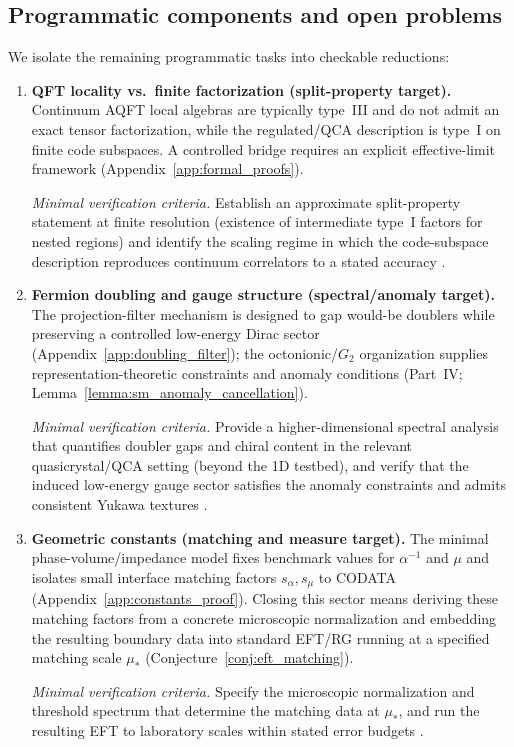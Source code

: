 \subsection{Programmatic components and open problems}
We isolate the remaining programmatic tasks into checkable reductions:
\begin{enumerate}
    \item \textbf{QFT locality vs.\ finite factorization (split-property target).}
    Continuum AQFT local algebras are typically type~III and do not admit an exact tensor factorization, while the regulated/QCA description is type~I on finite code subspaces. A controlled bridge requires an explicit effective-limit framework (Appendix~\ref{app:formal_proofs}).\par
    \textit{Minimal verification criteria.} Establish an approximate split-property statement at finite resolution (existence of intermediate type~I factors for nested regions) and identify the scaling regime in which the code-subspace description reproduces continuum correlators to a stated accuracy \cite{Haag1996,Buchholz1987}.

    \item \textbf{Fermion doubling and gauge structure (spectral/anomaly target).}
    The projection-filter mechanism is designed to gap would-be doublers while preserving a controlled low-energy Dirac sector (Appendix~\ref{app:doubling_filter}); the octonionic/$G_2$ organization supplies representation-theoretic constraints and anomaly conditions (Part~IV; Lemma~\ref{lemma:sm_anomaly_cancellation}).\par
    \textit{Minimal verification criteria.} Provide a higher-dimensional spectral analysis that quantifies doubler gaps and chiral content in the relevant quasicrystal/QCA setting (beyond the 1D testbed), and verify that the induced low-energy gauge sector satisfies the anomaly constraints and admits consistent Yukawa textures \cite{Nielsen1981,PeskinSchroeder1995}.

    \item \textbf{Geometric constants (matching and measure target).}
    The minimal phase-volume/impedance model fixes benchmark values for $\alpha^{-1}$ and $\mu$ and isolates small interface matching factors $s_\alpha,s_\mu$ to CODATA (Appendix~\ref{app:constants_proof}). Closing this sector means deriving these matching factors from a concrete microscopic normalization and embedding the resulting boundary data into standard EFT/RG running at a specified matching scale $\mu_\ast$ (Conjecture~\ref{conj:eft_matching}).\par
    \textit{Minimal verification criteria.} Specify the microscopic normalization and threshold spectrum that determine the matching data at $\mu_\ast$, and run the resulting EFT to laboratory scales within stated error budgets \cite{PeskinSchroeder1995}.


\end{enumerate}
